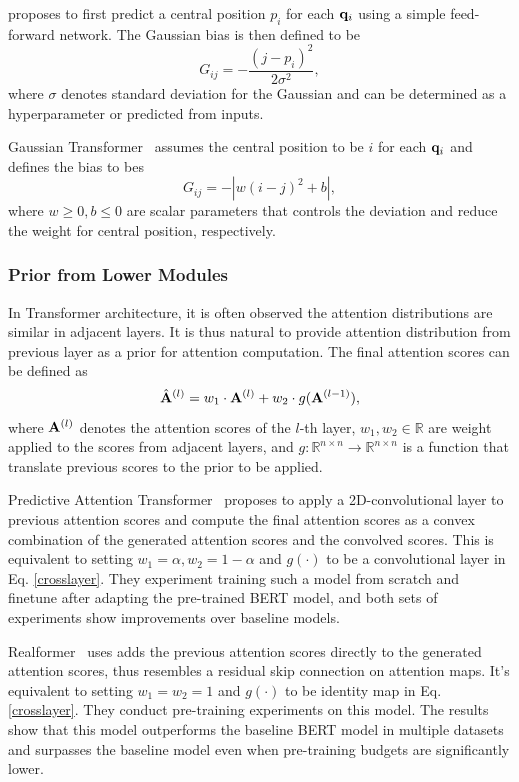\documentclass[manuscript,acmsmall,screen,nonacm]{acmart}
\theoremstyle{definition}
\begin{document}
\citet{yang18localness} proposes to first predict a central position $p_i$ for each $\mathbf{q}_i$ using a simple feed-forward network. The Gaussian bias is then defined to be
\begin{equation}
    G_{ij}=-\frac{(j-p_i)^2}{2\sigma^2},
\end{equation}
where $\sigma$ denotes standard deviation for the Gaussian and can be determined as a hyperparameter or predicted from inputs.

Gaussian Transformer~\cite{guo19gaussian} assumes the central position to be $i$ for each $\mathbf{q}_i$ and defines the bias to bes
\begin{equation}
    G_{ij}=-|w(i-j)^2+b|,
\end{equation}
where $w\ge 0, b\le 0$ are scalar parameters that controls the deviation and reduce the weight for central position, respectively.


\subsubsection{Prior from Lower Modules}\label{sec:prior_prev_module}

In Transformer architecture, it is often observed the attention distributions are similar in adjacent layers. It is thus natural to provide attention distribution from previous layer as a prior for attention computation. The final attention scores can be defined as
\begin{equation}\label{crosslayer}
    \hat{\mathbf{A}}^{(l)} = w_1\cdot\mathbf{A}^{(l)}+w_2\cdot g(\mathbf{A}^{(l-1)}),
\end{equation}
where $\mathbf{A}^{(l)}$ denotes the attention scores of the $l$-th layer, $w_1,w_2\in\mathbb R$ are weight applied to the scores from adjacent layers, and $g:\mathbb{R}^{n\times n}\rightarrow \mathbb{R}^{n\times n}$ is a function that translate previous scores to the prior to be applied.

Predictive Attention Transformer~\cite{wang2021predictive} proposes to apply a 2D-convolutional layer to previous attention scores and compute the final attention scores as a convex combination of the generated attention scores and the convolved scores. This is equivalent to setting $w_1=\alpha,w_2=1-\alpha$ and $g(\cdot)$ to be a convolutional layer in Eq. \eqref{crosslayer}. They experiment training such a model from scratch and finetune after adapting the pre-trained BERT model, and both sets of experiments show improvements over baseline models.

Realformer~\cite{he2020realformer} uses adds the previous attention scores directly to the generated attention scores, thus resembles a residual skip connection on attention maps. It's equivalent to setting $w_1=w_2=1$ and $g(\cdot)$ to be identity map in Eq. \eqref{crosslayer}. They conduct pre-training experiments on this model. The results show that this model outperforms the baseline BERT model in multiple datasets and surpasses the baseline model even when pre-training budgets are significantly lower.
\end{document}
